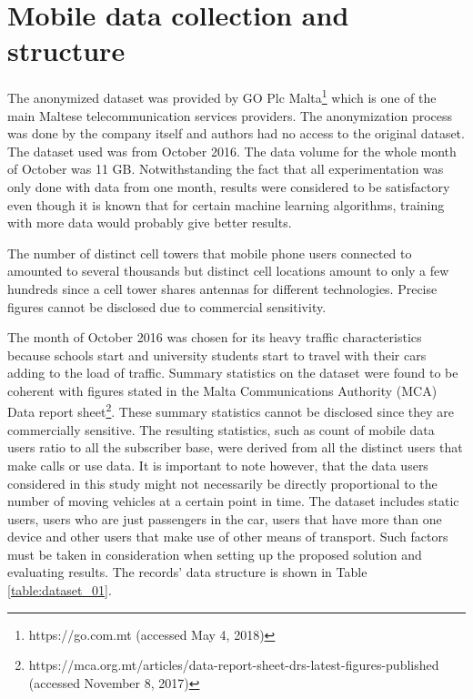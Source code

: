 \documentclass[12pt, a4paper]{report}
\theoremstyle{definition}
\theoremstyle{definition}%
\theoremstyle{definition}%
\theoremstyle{definition}%
\theoremstyle{definition}%
\theoremstyle{definition}%
\begin{document}
\section{Mobile data collection and structure} \label{section:methodology:mobile_data_collection_structure}

The anonymized dataset was provided by GO Plc Malta\footnote{https://go.com.mt (accessed May 4, 2018)} which is one of the main Maltese telecommunication services providers. The anonymization process was done by the company itself and authors had no access to the original dataset. The dataset used was from October 2016. The data volume for the whole month of October was 11 GB. Notwithstanding the fact that all experimentation was only done with data from one month, results were considered to be satisfactory even though it is known that for certain machine learning algorithms, training with more data would probably give better results. 

The number of distinct cell towers that mobile phone users connected to amounted to several thousands but distinct cell locations amount to only a few hundreds since a cell tower shares antennas for different technologies. Precise figures cannot be disclosed due to commercial sensitivity.

The month of October 2016 was chosen for its heavy traffic characteristics because schools start and university students start to travel with their cars adding to the load of traffic. Summary statistics on the dataset were found to be coherent with figures stated in the Malta Communications Authority (MCA) Data report sheet\footnote{https://mca.org.mt/articles/data-report-sheet-drs-latest-figures-published (accessed November 8, 2017)}. These summary statistics cannot be disclosed since they are commercially sensitive. The resulting statistics, such as count of mobile data users ratio to all the subscriber base, were derived from all the distinct users that make calls or use data. It is important to note however, that the data users considered in this study might not necessarily be directly proportional to the number of moving vehicles at a certain point in time. The dataset includes static users, users who are just passengers in the car, users that have more than one device and other users that make use of other means of transport. Such factors must be taken in consideration when setting up the proposed solution and evaluating results. The records' data structure is shown in Table \ref{table:dataset_01}.
\end{document}
